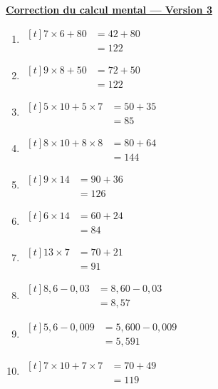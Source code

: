 \documentclass[12pt,a4paper]{article}
\newcommand{\titreversion}[1]{%
  \begin{center}%
    {\Large\underline{\textbf{#1}}}%
  \end{center}%
}
\begin{document}
\titreversion{Correction du calcul mental --- Version 3}
\begin{enumerate}
\item {$\begin{aligned}[t]
7\times 6+80 &= 42+80\\
             &= \boxed{122}
\end{aligned}$}
\item {$\begin{aligned}[t]
9\times 8+50 &= 72+50\\
             &= \boxed{122}
\end{aligned}$}
\item {$\begin{aligned}[t]
5\times 10+5\times 7 &= 50+35\\
                     &= \boxed{85}
\end{aligned}$}
\item {$\begin{aligned}[t]
8\times 10+8\times 8 &= 80+64\\
                     &= \boxed{144}
\end{aligned}$}
\item {$\begin{aligned}[t]
9\times 14 &= 90+36\\
           &= \boxed{126}
\end{aligned}$}
\item {$\begin{aligned}[t]
6\times 14 &= 60+24\\
           &= \boxed{84}
\end{aligned}$}
\item {$\begin{aligned}[t]
13\times 7 &= 70+21\\
           &= \boxed{91}
\end{aligned}$}
\item {$\begin{aligned}[t]
8{,}6-0{,}03 &= 8{,}60-0{,}03\\
             &= \boxed{8{,}57}
\end{aligned}$}
\item {$\begin{aligned}[t]
5{,}6-0{,}009 &= 5{,}600-0{,}009\\
              &= \boxed{5{,}591}
\end{aligned}$}
\item {$\begin{aligned}[t]
7\times 10+7\times 7 &= 70+49\\
                     &= \boxed{119}
\end{aligned}$}
\end{enumerate}
\newpage
\end{document}
